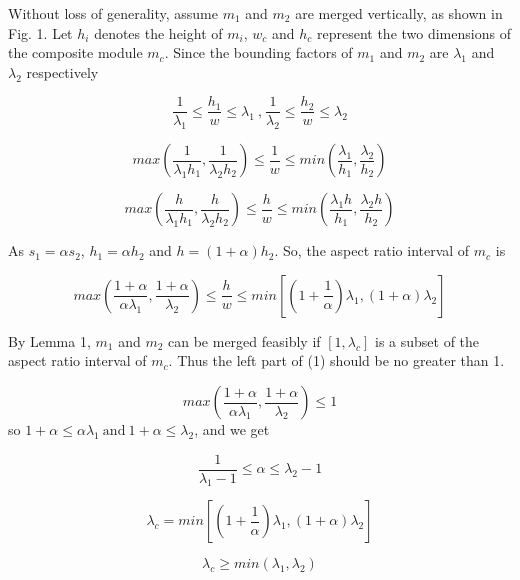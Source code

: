 \documentclass[conference]{IEEEtran}
\begin{document}
\begin{IEEEproof}
Without loss of generality, assume $m_1$ and $m_2$ are merged vertically, as shown in Fig. 1. Let $h_i$ denotes the height of $m_i$, $w_c$ and $h_c$ represent the two dimensions of the composite module $m_c$. Since the bounding factors of $m_1$ and $m_2$ are $\lambda_1$ and $\lambda_2$ respectively

\begin{center}
$$\frac{1}{\lambda_1} \le \frac{h_1}{w} \le \lambda_1 ~ \textrm{,} ~ \frac{1}{\lambda_2} \le \frac{h_2}{w} \le \lambda_2$$
\end{center}


$$max(\frac{1}{\lambda_1h_1},\frac{1}{\lambda_2h_2}) \le \frac{1}{w} \le min(\frac{\lambda_1}{h_1},\frac{\lambda_2}{h_2})$$


$$max(\frac{h}{\lambda_1h_1},\frac{h}{\lambda_2h_2}) \le \frac{h}{w} \le min(\frac{\lambda_1h}{h_1},\frac{\lambda_2h}{h_2})$$


As $s_1=\alpha s_2$, $h_1=\alpha h_2$ and $h=(1+\alpha)h_2$. So, the aspect ratio interval of $m_c$ is

\begin{equation}
max(\frac{1+\alpha}{\alpha\lambda_1},\frac{1+\alpha}{\lambda_2}) \le \frac{h}{w} \le min[(1+\frac{1}{\alpha})\lambda_1,(1+\alpha)\lambda_2]
\end{equation}


By Lemma 1, $m_1$ and $m_2$ can be merged feasibly if $[1,\lambda_c]$ is a subset of the aspect ratio interval of $m_c$. Thus the left part of (1) should be no greater than 1.

$$max(\frac{1+\alpha}{\alpha\lambda_1},\frac{1+\alpha}{\lambda_2}) \le 1$$
so $1+\alpha \le \alpha\lambda_1~ \textrm{and} ~1+\alpha \le \lambda_2$, and we get

\begin{equation}
\frac{1}{\lambda_1-1} \le \alpha \le \lambda_2-1
\end{equation}


$$\lambda_c=min[(1+\frac{1}{\alpha})\lambda_1,(1+\alpha)\lambda_2]$$


\begin{equation}
\lambda_c \ge min(\lambda_1,\lambda_2)
\end{equation}

\end{IEEEproof}
\end{document}
